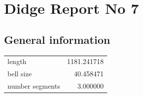 \documentclass{article}
\begin{document}
\begin{centering}
\begin{figure}[!htb]
\end{figure}
\end{centering}
\section{Didge Report No 7}

\subsection{General information}
\begin{centering}

\begin{figure}[!htb]
\end{figure}
\begin{tabular}{lr}
\toprule
         length & 1181.241718 \\
      bell size &   40.458471 \\
number segments &    3.000000 \\
\bottomrule
\end{tabular}
\end{centering}
\end{document}
